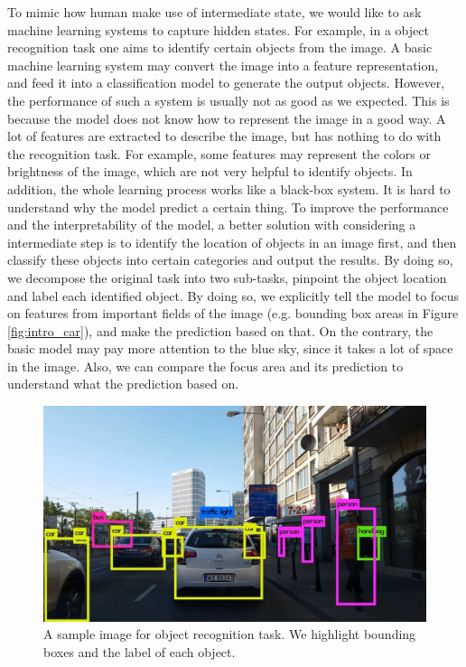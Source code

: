 To mimic how human make use of intermediate state, we would like to ask machine learning systems to capture hidden states. For example, in a object recognition task one aims to identify certain objects from the image. A basic machine learning system may convert the image into a feature representation, and feed it into a classification model to generate the output objects. However, the performance of such a system is usually not as good as we expected. This is because the model does not know how to represent the image in a good way. A lot of features are extracted to describe the image, but has nothing to do with the recognition task. For example, some features may represent the colors or brightness of the image, which are not very helpful to identify objects. In addition, the whole learning process works like a black-box system. It is hard to understand why the model predict a certain thing. To improve the performance and the interpretability of the model, a better solution with considering a intermediate step is to identify the location of objects in an image first, and then classify these objects into certain categories and output the results. By doing so, we decompose the original task into two sub-tasks, pinpoint the object location and label each identified object. By doing so, we explicitly tell the model to focus on features from important fields of the image (e.g. bounding box areas in Figure \ref{fig:intro_car}), and make the prediction based on that. On the contrary, the basic model may pay more attention to the blue sky, since it takes a lot of space in the image. Also, we can compare the focus area and its prediction to understand what the prediction based on.

\begin{figure}[t] 
\centering
\includegraphics[width=1.0\columnwidth]{Images/intro_car.jpg} 
  \caption{A sample image for object recognition task. We highlight bounding boxes and the label of each object.}
\end{figure}\label{fig:intro_car} 


